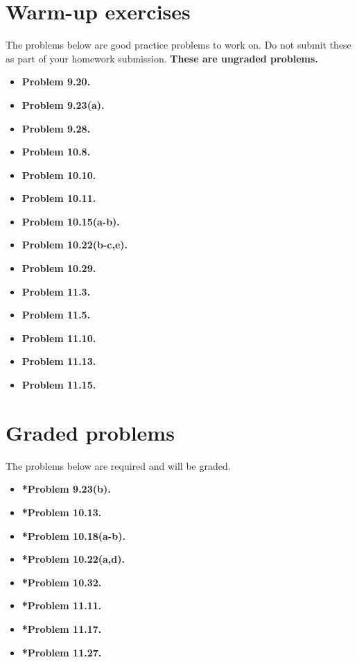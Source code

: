 \documentclass[11pt]{article}
\begin{document}
\vspace{0.2in}


\newpage
\section*{Warm-up exercises}
The problems below are good practice problems to work on.
Do not submit these as part of your homework submission.
\textbf{These are ungraded problems.}

\begin{multicols}{2}
\begin{itemize}

\item \textbf{Problem 9.20.}
\item \textbf{Problem 9.23(a).}
\item \textbf{Problem 9.28.}
\item \textbf{Problem 10.8.}
\item \textbf{Problem 10.10.}
\item \textbf{Problem 10.11.}
\item \textbf{Problem 10.15(a-b).}
\item \textbf{Problem 10.22(b-c,e).}
\item \textbf{Problem 10.29.}
\item \textbf{Problem 11.3.}
\item \textbf{Problem 11.5.}
\item \textbf{Problem 11.10.}
\item \textbf{Problem 11.13.}
\item \textbf{Problem 11.15.}

\end{itemize}
\end{multicols}

\section*{Graded problems}
The problems below are required and will be graded.
\begin{itemize}

\item \textbf{*Problem 9.23(b).}
\item \textbf{*Problem 10.13.}
\item \textbf{*Problem 10.18(a-b).}
\item \textbf{*Problem 10.22(a,d).}
\item \textbf{*Problem 10.32.}
\item \textbf{*Problem 11.11.}
\item \textbf{*Problem 11.17.}
\item \textbf{*Problem 11.27.}

\end{itemize}
\end{document}
